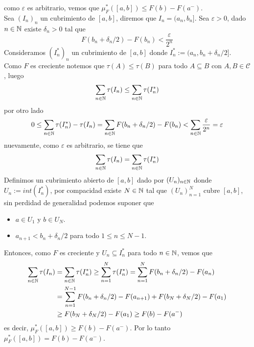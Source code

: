 \documentclass{article}
\begin{document}
\begin{enumerate}
    como $\varepsilon$ es arbitrario, vemos que $\mu_{F}^{*}([a,b])\leq F(b)-F(a^{-})$. 
    \vspace{2mm}\\
    Sea $(I_{n})_{n}$ un cubrimiento de $[a,b]$, diremos que $I_{n}=(a_{n},b_{n}]$. Sea 
    $\varepsilon>0$, dado $n\in\mathbb{N}$ existe $\delta_{n}>0$ tal que
    \begin{equation*}
        F(b_{n}+\delta_{n}/2)-F(b_{n})<\frac{\varepsilon}{2^{n}}
    \end{equation*}
    Consideramos $(I_{n}^{*})_{n}$ un cubrimiento de $[a,b]$ donde $I_{n}^{*}:=
    (a_{n},b_{n}+\delta_{n}/2]$. Como $F$ es creciente notemos que $\tau(A)\leq\tau(B)$ para todo 
    $A\subseteq B$ con $A,B\in\mathcal{C}$, luego
    \begin{equation*}
        \sum_{n\in\mathbb{N}}\tau(I_{n})\leq\sum_{n\in\mathbb{N}}\tau(I_{n}^{*})
    \end{equation*}
    por otro lado
    \begin{equation*}
        0\leq\sum_{n\in\mathbb{N}}\tau(I_{n}^{*})-\tau(I_{n})=\sum_{n\in\mathbb{N}}F(b_{n}+{\delta_{n}/2})
        -F(b_{n})<\sum_{n\in\mathbb{N}}\frac{\varepsilon}{2^{n}}=\varepsilon
    \end{equation*}
    nuevamente, como $\varepsilon$ es arbitrario, se tiene que
    \begin{equation*}
        \sum_{n\in\mathbb{N}}\tau(I_{n})=\sum_{n\in\mathbb{N}}\tau(I_{n}^{*})
    \end{equation*}
    Definimos un cubrimiento abierto de $[a,b]$ dado por $(U_{n})_{n\in\mathbb{N}}$ donde 
    $U_{n}:=int(I_{n}^{*})$, por compacidad existe $N\in\mathbb{N}$ tal que $(U_{n})_{n=1}^{N}$ cubre 
    $[a,b]$, sin perdidad de generalidad podemos suponer que
    \begin{itemize}
        \item $a\in U_{1}$ y $b\in U_{N}$.
        \item $a_{n+1}<b_{n}+\delta_{n}/2$ para todo $1\leq n\leq N-1$.
    \end{itemize}
    Entonces, como $F$ es creciente y $U_{n}\subseteq I_{n}^{*}$ para todo $n\in\mathbb{N}$, vemos que
    \begin{align*}
        \sum_{n\in\mathbb{N}}\tau(I_{n}) &= \sum_{n\in\mathbb{N}}\tau(I_{n}^{*})\geq
        \sum_{n=1}^{N}\tau(I_{n}^{*})=\sum_{n=1}^{N}F(b_{n}+\delta_{n}/2)-F(a_{n}) \\
        &= \sum_{n=1}^{N-1}F(b_{n}+\delta_{n}/2)-F(a_{n+1})+F(b_{N}+\delta_{N}/2)-F(a_{1}) \\
        &\geq F(b_{N}+\delta_{N}/2)-F(a_{1})\geq F(b)-F(a^{-})
    \end{align*}
    es decir, $\mu_{F}^{*}([a,b])\geq F(b)-F(a^{-})$. Por lo tanto 
    $\mu_{F}^{*}([a,b])=F(b)-F(a^{-})$.
    

\end{enumerate}
\end{document}
